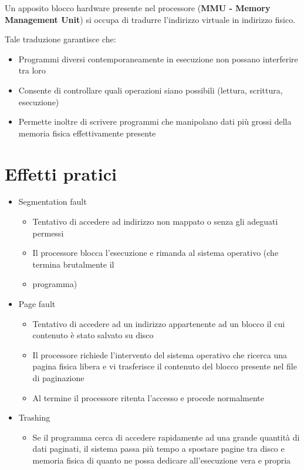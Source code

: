 Un apposito blocco hardware presente nel processore (\textbf{MMU - Memory Management Unit}) si occupa di tradurre l'indirizzo virtuale in indirizzo fisico.

Tale traduzione garantisce che:

\begin{itemize}
  \item Programmi diversi contemporaneamente in esecuzione non possano interferire tra loro
  \item Consente di controllare quali operazioni siano possibili (lettura, scrittura, esecuzione)
  \item Permette inoltre di scrivere programmi che manipolano dati più grossi della memoria fisica effettivamente presente
\end{itemize}



\section{Effetti pratici  }
\begin{itemize}
  \item Segmentation fault
        \begin{itemize}
          \item Tentativo di accedere ad indirizzo non mappato o senza gli adeguati permessi
          \item Il processore blocca l'esecuzione e rimanda al sistema operativo (che termina brutalmente il
          \item programma)
        \end{itemize}
  \item Page fault
        \begin{itemize}
          \item Tentativo di accedere ad un indirizzo appartenente ad un blocco il cui contenuto è stato salvato su disco
          \item Il processore richiede l'intervento del sistema operativo che ricerca una pagina fisica libera e vi trasferisce il contenuto del blocco presente nel file di paginazione
          \item Al termine il processore ritenta l'accesso e procede normalmente
        \end{itemize}
  \item Trashing
        \begin{itemize}
          \item Se il programma cerca di accedere rapidamente ad una grande quantità di dati paginati, il sistema passa più  tempo a spostare pagine tra disco e memoria fisica di quanto ne possa dedicare all'esecuzione vera e propria
        \end{itemize}
\end{itemize}


